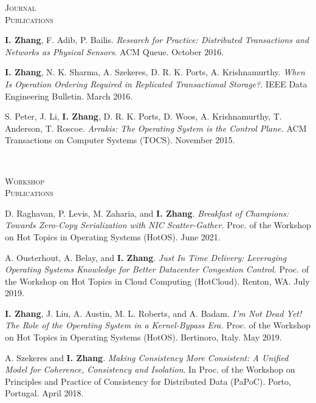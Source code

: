 \documentclass[10pt,times]{report}
\newlength{\sectiongap}
\newlength{\sectioncolwidth}
\newlength{\colgap}
\newlength{\stuffwidth}
\newenvironment{rtable}{
  \begin{minipage}{\textwidth}
  }{
  \end{minipage}
}
\newenvironment{rsection}[1]{
  \begin{minipage}[t]{\sectioncolwidth}
    \textsc{#1}
  \end{minipage}
  \hspace{\colgap}
  \begin{minipage}[t]{\stuffwidth}
  }{
    \removelastskip
  \end{minipage}
  \\[\sectiongap]
}
\begin{document}
\begin{rtable}
\begin{rsection}{Journal\\Publications}
    \textbf{I. Zhang}, F. Adib, P. Bailis. \textit{Research for
      Practice: Distributed Transactions and Networks as Physical
      Sensors}. ACM Queue. October 2016.\\\vspace{-0.5em}

    \textbf{I. Zhang}, N. K. Sharma, A. Szekeres,
    D. R. K. Ports, A. Krishnamurthy. \textit{When Is Operation
      Ordering Required in Replicated Transactional Storage?}.  IEEE
    Data Engineering Bulletin. March 2016.\\\vspace{-0.5em}

    S. Peter, J. Li, \textbf{I. Zhang}, D. R. K. Ports, D. Woos,
    A. Krishnamurthy, T. Anderson, T. Roscoe.  \textit{Arrakis: The
      Operating System is the Control Plane.}  ACM Transactions on
    Computer Systems (TOCS). November 2015.
  \end{rsection}
  
  \begin{rsection}{Workshop\\Publications}
    D. Raghavan, P. Levis, M. Zaharia, and
    \textbf{I. Zhang}. \textit{Breakfast of Champions: Towards
      Zero-Copy Serialization with NIC Scatter-Gather.}  Proc.
    of the Workshop on Hot Topics in Operating Systems (HotOS). June
    2021.\\\vspace{-0.5em}

    A. Ousterhout, A. Belay, and \textbf{I. Zhang}. \textit{Just In
      Time Delivery: Leveraging Operating Systems Knowledge for Better
      Datacenter Congestion Control.  } Proc. of the Workshop on
    Hot Topics in Cloud Computing (HotCloud). Renton, WA. July
    2019. \\\vspace{-0.5em}

    \textbf{I. Zhang}, J. Liu, A. Austin, M.  L. Roberts, and
    A. Badam.  \textit{I'm Not Dead Yet! The Role of the Operating
      System in a Kernel-Bypass Era. } Proc. of the Workshop on
    Hot Topics in Operating Systems (HotOS). Bertinoro, Italy. May
    2019.\\\vspace{-0.5em}

    A. Szekeres and \textbf{I. Zhang}. \textit{Making Consistency More
      Consistent: A Unified Model for Coherence, Consistency and
      Isolation}. In Proc. of the Workshop on Principles and
    Practice of Consistency for Distributed Data (PaPoC). Porto,
    Portugal. April 2018. \\\vspace{-0.5em}


\end{rsection}
\end{rtable}
\end{document}
